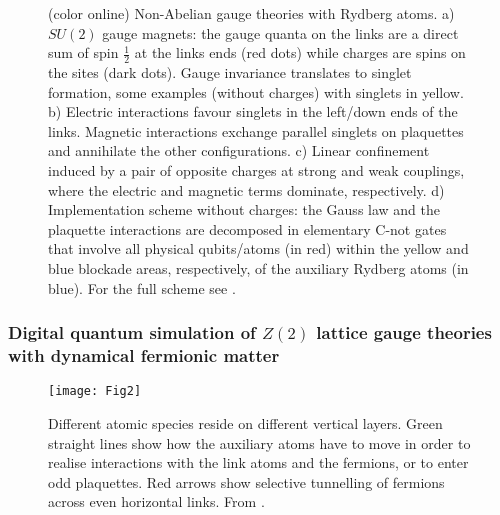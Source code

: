\documentclass[epj,final]{svjour}
\begin{document}
\begin{figure}[h!]
\begin{center}
\caption{(color online) Non-Abelian gauge theories with Rydberg atoms.
a) $SU(2)$ gauge magnets: the gauge quanta on the links are a direct sum of spin $\frac 12$ at the links ends (red dots) while charges are spins on the sites (dark dots). Gauge invariance translates to singlet formation, some examples (without charges) with singlets in yellow. b) Electric interactions favour singlets in the left/down ends of the links. Magnetic interactions exchange parallel singlets on plaquettes and annihilate the other configurations. c) Linear confinement induced by a pair of opposite charges at strong and weak couplings, where the electric and magnetic terms dominate, respectively. d) Implementation scheme without charges: the Gauss law and the plaquette interactions are decomposed in elementary C-not gates that involve all physical qubits/atoms (in red)  within the yellow and blue blockade areas, respectively, of the auxiliary Rydberg atoms (in blue). For the full scheme see  \cite{tagliacozzo2013simulation}.} 
\label{fig:tagliacozzo2013simulation}
\end{center}
\end{figure}

\subsubsection{Digital quantum simulation of $Z(2)$ lattice gauge theories with dynamical fermionic matter\cite{zohar2017digital,zohar2017digitalA}}

\begin{figure}[h!]
\begin{center}
\texttt{[image: Fig2]} 
\end{center}
\caption{Different atomic species reside on different vertical layers. Green straight lines show how the auxiliary atoms have to move in order to realise interactions with the link atoms and the fermions, or to enter odd plaquettes. Red arrows show selective tunnelling of fermions across even horizontal links. From \cite{zohar2017digital}. }
\end{figure}
\end{document}
